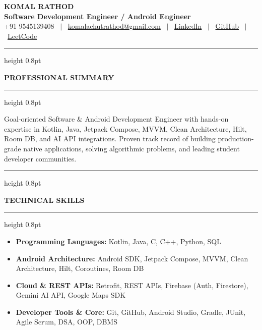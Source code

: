 \documentclass[letterpaper,10pt]{article}
\newcommand{\resumesection}[1]{%
  \vspace{4pt}%
  {\color{navy}\hrule height 0.8pt}%
  \vspace{2.5pt}%
  \begin{center}%
    {\color{navy}\bfseries\small\MakeUppercase{#1}}%
  \end{center}%
  \vspace{-7.5pt}%
  {\color{navy}\hrule height 0.8pt}%
  \vspace{3pt}%
}
\begin{document}
\begin{center}
    {\Large \bfseries \color{navy} KOMAL RATHOD} \\[2pt]
    {\small \bfseries \color{navy} Software Development Engineer / Android Engineer} \\[3pt]
    \small
    +91 9545139408 \ $|$ \
    \href{mailto:komalachutrathod@gmail.com}{komalachutrathod@gmail.com} \ $|$ \
    \href{https://www.linkedin.com/in/komal-achut-rathod}{LinkedIn} \ $|$ \
    \href{https://github.com/itsKomal1508}{GitHub} \ $|$ \
    \href{https://leetcode.com/u/Komal_rathod15/}{LeetCode}
\end{center}
\vspace{-6pt}

\resumesection{Professional Summary}
\begin{center}
\begin{minipage}{0.98\textwidth}
\small \color{charcoal}
Goal-oriented Software \& Android Development Engineer with hands-on expertise in Kotlin, Java, Jetpack Compose, MVVM, Clean Architecture, Hilt, Room DB, and AI API integrations. Proven track record of building production-grade native applications, solving algorithmic problems, and leading student developer communities.
\end{minipage}
\end{center}
\vspace{-4pt}

\resumesection{Technical Skills}
\begin{itemize}[leftmargin=0.15in, label={}, itemsep=-2pt, topsep=0pt, parsep=0pt]
\small
\item \textbf{Programming Languages:} Kotlin, Java, C, C++, Python, SQL
\item \textbf{Android Architecture:} Android SDK, Jetpack Compose, MVVM, Clean Architecture, Hilt, Coroutines, Room DB
\item \textbf{Cloud \& REST APIs:} Retrofit, REST APIs, Firebase (Auth, Firestore), Gemini AI API, Google Maps SDK
\item \textbf{Developer Tools \& Core:} Git, GitHub, Android Studio, Gradle, JUnit, Agile Scrum, DSA, OOP, DBMS
\end{itemize}
\vspace{-2pt}
\end{document}
